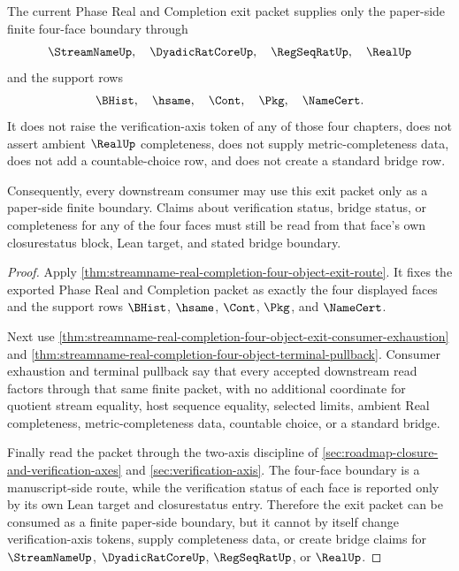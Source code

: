 \begin{theorem}
\label{thm:streamname-real-completion-exit-axis-separation}
The current Phase Real and Completion exit packet supplies only the paper-side finite four-face boundary through
$$
\StreamNameUp,\quad \DyadicRatCoreUp,\quad \RegSeqRatUp,\quad \RealUp
$$
and the support rows
$$
\BHist,\quad \hsame,\quad \Cont,\quad \Pkg,\quad \NameCert.
$$
It does not raise the verification-axis token of any of those four chapters, does not assert ambient $\RealUp$ completeness, does not supply metric-completeness data, does not add a countable-choice row, and does not create a standard bridge row.

Consequently, every downstream consumer may use this exit packet only as a paper-side finite boundary. Claims about verification status, bridge status, or completeness for any of the four faces must still be read from that face's own closurestatus block, Lean target, and stated bridge boundary.
\end{theorem}
\begin{proof}
Apply \autoref{thm:streamname-real-completion-four-object-exit-route}. It fixes the exported Phase Real and Completion packet as exactly the four displayed faces and the support rows $\BHist$, $\hsame$, $\Cont$, $\Pkg$, and $\NameCert$.

Next use \autoref{thm:streamname-real-completion-four-object-exit-consumer-exhaustion} and \autoref{thm:streamname-real-completion-four-object-terminal-pullback}. Consumer exhaustion and terminal pullback say that every accepted downstream read factors through that same finite packet, with no additional coordinate for quotient stream equality, host sequence equality, selected limits, ambient Real completeness, metric-completeness data, countable choice, or a standard bridge.

Finally read the packet through the two-axis discipline of \autoref{sec:roadmap-closure-and-verification-axes} and \autoref{sec:verification-axis}. The four-face boundary is a manuscript-side route, while the verification status of each face is reported only by its own Lean target and closurestatus entry. Therefore the exit packet can be consumed as a finite paper-side boundary, but it cannot by itself change verification-axis tokens, supply completeness data, or create bridge claims for $\StreamNameUp$, $\DyadicRatCoreUp$, $\RegSeqRatUp$, or $\RealUp$.
\end{proof}

